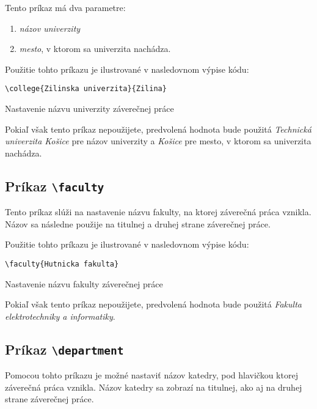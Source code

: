 Tento príkaz má dva parametre:

\begin{enumerate}
    \item {\it názov univerzity} 
    \item {\it mesto}, v ktorom sa univerzita nachádza. 
\end{enumerate}

Použitie tohto príkazu je ilustrované v nasledovnom výpise kódu:

\begin{listing}[ht]
\begin{verbatim}
\college{Zilinska univerzita}{Zilina}
\end{verbatim}
\caption{Nastavenie názvu univerzity záverečnej práce}
\end{listing}

Pokiaľ však tento príkaz nepoužijete, predvolená hodnota bude použitá {\it Technická univerzita Košice} pre názov univerzity a {\it Košice} pre mesto, v ktorom sa univerzita nachádza.


\subsection{Príkaz {\tt \textbackslash{}faculty}}

Tento príkaz slúži na nastavenie názvu fakulty, na ktorej záverečná práca vznikla. Názov sa následne použije na titulnej a druhej strane záverečnej práce.

Použitie tohto príkazu je ilustrované v nasledovnom výpise kódu:

\begin{listing}[ht]
\begin{verbatim}
\faculty{Hutnicka fakulta}
\end{verbatim}
\caption{Nastavenie názvu fakulty záverečnej práce}
\end{listing}

Pokiaľ však tento príkaz nepoužijete, predvolená hodnota bude použitá {\it Fakulta elektrotechniky a informatiky}.


\subsection{Príkaz {\tt \textbackslash{}department}}

Pomocou tohto príkazu je možné nastaviť názov katedry, pod hlavičkou ktorej záverečná práca vznikla. Názov katedry sa zobrazí na titulnej, ako aj na druhej strane záverečnej práce.

